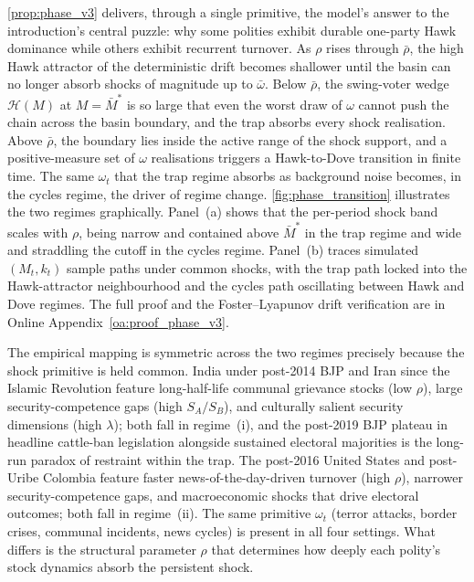 \documentclass[11pt,twoside]{extarticle}
\begin{document}
\autoref{prop:phase_v3} delivers, through a single primitive, the model's answer to the introduction's central puzzle: why some polities exhibit durable one-party Hawk dominance while others exhibit recurrent turnover. As $\rho$ rises through $\bar\rho$, the high Hawk attractor of the deterministic drift becomes shallower until the basin can no longer absorb shocks of magnitude up to $\bar\omega$. Below $\bar\rho$, the swing-voter wedge $\mathcal H(M)$ at $M=\bar M^*$ is so large that even the worst draw of $\omega$ cannot push the chain across the basin boundary, and the trap absorbs every shock realisation. Above $\bar\rho$, the boundary lies inside the active range of the shock support, and a positive-measure set of $\omega$ realisations triggers a Hawk-to-Dove transition in finite time. The same $\omega_t$ that the trap regime absorbs as background noise becomes, in the cycles regime, the driver of regime change. \autoref{fig:phase_transition} illustrates the two regimes graphically. Panel~(a) shows that the per-period shock band scales with $\rho$, being narrow and contained above $\bar M^*$ in the trap regime and wide and straddling the cutoff in the cycles regime. Panel~(b) traces simulated $(M_t,k_t)$ sample paths under common shocks, with the trap path locked into the Hawk-attractor neighbourhood and the cycles path oscillating between Hawk and Dove regimes. The full proof and the Foster--Lyapunov drift verification are in Online Appendix~\ref{oa:proof_phase_v3}.

The empirical mapping is symmetric across the two regimes precisely because the shock primitive is held common. India under post-2014 BJP and Iran since the Islamic Revolution feature long-half-life communal grievance stocks (low $\rho$), large security-competence gaps (high $S_A/S_B$), and culturally salient security dimensions (high $\lambda$); both fall in regime~(i), and the post-2019 BJP plateau in headline cattle-ban legislation alongside sustained electoral majorities is the long-run paradox of restraint within the trap. The post-2016 United States and post-Uribe Colombia feature faster news-of-the-day-driven turnover (high $\rho$), narrower security-competence gaps, and macroeconomic shocks that drive electoral outcomes; both fall in regime~(ii). The same primitive $\omega_t$ (terror attacks, border crises, communal incidents, news cycles) is present in all four settings. What differs is the structural parameter $\rho$ that determines how deeply each polity's stock dynamics absorb the persistent shock.
\end{document}
